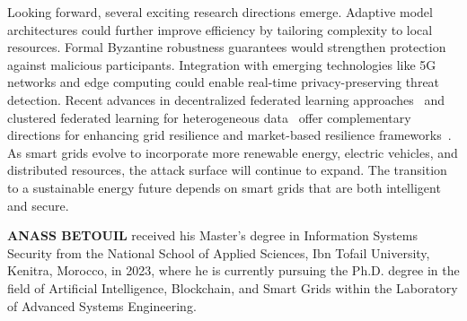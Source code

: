\documentclass{ieeeaccess}
\theoremstyle{definition}
\begin{document}
Looking forward, several exciting research directions emerge. Adaptive model architectures could further improve efficiency by tailoring complexity to local resources. Formal Byzantine robustness guarantees would strengthen protection against malicious participants. Integration with emerging technologies like 5G networks and edge computing could enable real-time privacy-preserving threat detection. Recent advances in decentralized federated learning approaches~\cite{husnoo2024decentralized} and clustered federated learning for heterogeneous data~\cite{li2025clustered} offer complementary directions for enhancing grid resilience and market-based resilience frameworks~\cite{pereira2024federated}. As smart grids evolve to incorporate more renewable energy, electric vehicles, and distributed resources, the attack surface will continue to expand. The transition to a sustainable energy future depends on
smart grids that are both intelligent and secure.














%




\begin{IEEEbiographynophoto}{\textbf{ANASS BETOUIL}} received his Master’s degree in Information Systems Security from the National School of Applied Sciences, Ibn Tofail University, Kenitra, Morocco, in 2023, where he is currently pursuing the Ph.D. degree in the field of Artificial Intelligence, Blockchain, and Smart Grids within the Laboratory of Advanced Systems Engineering.
\end{IEEEbiographynophoto}
\end{document}

